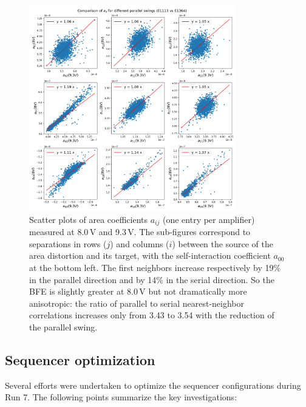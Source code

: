 \begin{figure}[ht]
\begin{centering}
\includegraphics[width=0.8\textwidth]{figures/aScatterPlots8vs9-3.png}
\end{centering}
\caption{Scatter plots of area coefficients $a_{ij}$ (one entry per amplifier)
measured at 8.0\,V and 9.3\,V. The sub-figures correspond to separations in rows ($j$) and columns ($i$)
between the source of the area distortion and its target, with the self-interaction coefficient $a_{00}$ at the bottom left. The first neighbors increase
respectively by 19\% in the parallel direction and by 14\% in the serial
direction. So the BFE is slightly greater at 8.0\,V but not dramatically
more anisotropic: the ratio of parallel to serial nearest-neighbor correlations increases only from 3.43 to 3.54 with the reduction of the parallel swing.}
\label{fig:area-coeffs}
\end{figure}


\subsection{Sequencer optimization}\label{sequencer-optimization}
Several efforts were undertaken to optimize the sequencer configurations during Run 7. The following points summarize the key investigations:

